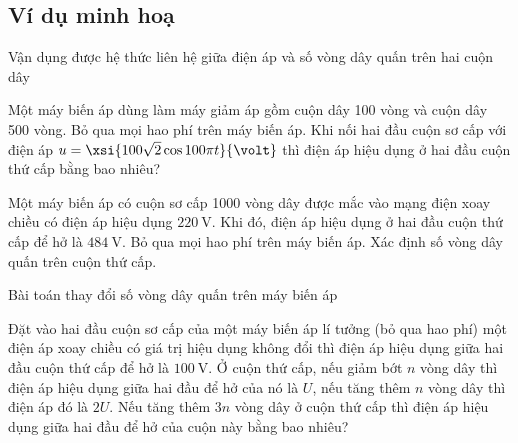 \subsection{Ví dụ minh hoạ}
\begin{dang}{Vận dụng được hệ thức liên hệ giữa điện áp và số vòng dây quấn trên hai cuộn dây}
	\end{dang}
\begin{vd}
	Một máy biến áp dùng làm máy giảm áp gồm cuộn dây 100 vòng và cuộn dây 500 vòng. Bỏ qua mọi hao phí trên máy biến áp. Khi nối hai đầu cuộn sơ cấp với điện áp $u=\xsi{100\sqrt{2}\cos100\pi t}{\volt}$ thì điện áp hiệu dụng ở hai đầu cuộn thứ cấp bằng bao nhiêu?
\end{vd}
\begin{vd}
Một máy biến áp có cuộn sơ cấp 1000 vòng dây được mắc vào mạng điện xoay chiều có điện áp hiệu dụng $\SI{220}{\volt}$. Khi đó, điện áp hiệu dụng ở hai đầu cuộn thứ cấp để hở là $\SI{484}{\volt}$. Bỏ qua mọi hao phí trên máy biến áp. Xác định số vòng dây quấn trên cuộn thứ cấp.
\end{vd}
\begin{dang}{Bài toán thay đổi số vòng dây quấn trên máy biến áp}
	\end{dang}
	\begin{vd}
		Đặt vào hai đầu cuộn sơ cấp của một máy biến áp lí tưởng (bỏ qua hao phí) một điện áp xoay chiều có giá trị hiệu dụng không đổi thì điện áp hiệu dụng giữa hai đầu cuộn thứ cấp để hở là $\SI{100}{\volt}$. Ở cuộn thứ cấp, nếu giảm bớt $n$ vòng dây thì điện áp hiệu dụng giữa hai đầu để hở của nó là $U$, nếu tăng thêm $n$ vòng dây thì điện áp đó là $2U$. Nếu tăng thêm $3n$ vòng dây ở cuộn thứ cấp thì điện áp hiệu dụng giữa hai đầu để hở của cuộn này bằng bao nhiêu?
	\end{vd}
